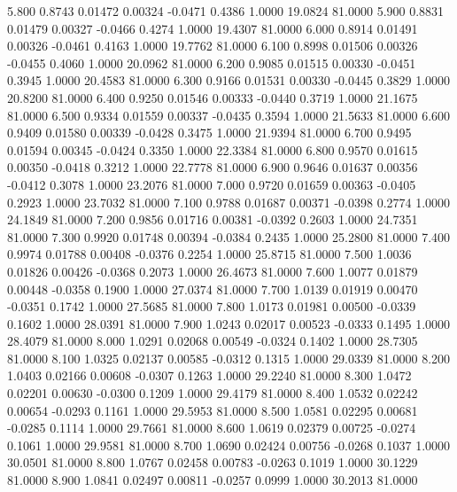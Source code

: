    5.800   0.8743   0.01472   0.00324  -0.0471   0.4386   1.0000  19.0824  81.0000
   5.900   0.8831   0.01479   0.00327  -0.0466   0.4274   1.0000  19.4307  81.0000
   6.000   0.8914   0.01491   0.00326  -0.0461   0.4163   1.0000  19.7762  81.0000
   6.100   0.8998   0.01506   0.00326  -0.0455   0.4060   1.0000  20.0962  81.0000
   6.200   0.9085   0.01515   0.00330  -0.0451   0.3945   1.0000  20.4583  81.0000
   6.300   0.9166   0.01531   0.00330  -0.0445   0.3829   1.0000  20.8200  81.0000
   6.400   0.9250   0.01546   0.00333  -0.0440   0.3719   1.0000  21.1675  81.0000
   6.500   0.9334   0.01559   0.00337  -0.0435   0.3594   1.0000  21.5633  81.0000
   6.600   0.9409   0.01580   0.00339  -0.0428   0.3475   1.0000  21.9394  81.0000
   6.700   0.9495   0.01594   0.00345  -0.0424   0.3350   1.0000  22.3384  81.0000
   6.800   0.9570   0.01615   0.00350  -0.0418   0.3212   1.0000  22.7778  81.0000
   6.900   0.9646   0.01637   0.00356  -0.0412   0.3078   1.0000  23.2076  81.0000
   7.000   0.9720   0.01659   0.00363  -0.0405   0.2923   1.0000  23.7032  81.0000
   7.100   0.9788   0.01687   0.00371  -0.0398   0.2774   1.0000  24.1849  81.0000
   7.200   0.9856   0.01716   0.00381  -0.0392   0.2603   1.0000  24.7351  81.0000
   7.300   0.9920   0.01748   0.00394  -0.0384   0.2435   1.0000  25.2800  81.0000
   7.400   0.9974   0.01788   0.00408  -0.0376   0.2254   1.0000  25.8715  81.0000
   7.500   1.0036   0.01826   0.00426  -0.0368   0.2073   1.0000  26.4673  81.0000
   7.600   1.0077   0.01879   0.00448  -0.0358   0.1900   1.0000  27.0374  81.0000
   7.700   1.0139   0.01919   0.00470  -0.0351   0.1742   1.0000  27.5685  81.0000
   7.800   1.0173   0.01981   0.00500  -0.0339   0.1602   1.0000  28.0391  81.0000
   7.900   1.0243   0.02017   0.00523  -0.0333   0.1495   1.0000  28.4079  81.0000
   8.000   1.0291   0.02068   0.00549  -0.0324   0.1402   1.0000  28.7305  81.0000
   8.100   1.0325   0.02137   0.00585  -0.0312   0.1315   1.0000  29.0339  81.0000
   8.200   1.0403   0.02166   0.00608  -0.0307   0.1263   1.0000  29.2240  81.0000
   8.300   1.0472   0.02201   0.00630  -0.0300   0.1209   1.0000  29.4179  81.0000
   8.400   1.0532   0.02242   0.00654  -0.0293   0.1161   1.0000  29.5953  81.0000
   8.500   1.0581   0.02295   0.00681  -0.0285   0.1114   1.0000  29.7661  81.0000
   8.600   1.0619   0.02379   0.00725  -0.0274   0.1061   1.0000  29.9581  81.0000
   8.700   1.0690   0.02424   0.00756  -0.0268   0.1037   1.0000  30.0501  81.0000
   8.800   1.0767   0.02458   0.00783  -0.0263   0.1019   1.0000  30.1229  81.0000
   8.900   1.0841   0.02497   0.00811  -0.0257   0.0999   1.0000  30.2013  81.0000
